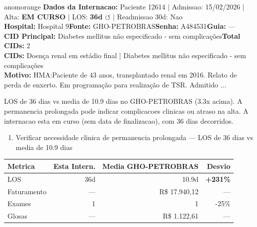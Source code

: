 \documentclass[a4paper,10pt]{article}
\begin{document}
\begin{anomalycard}[Internacao 165811 | GHO-PETROBRAS | ALTO (z=3.01)]{anomorange}
\textbf{Dados da Internacao:} Paciente 12614 $\mid$ Admissao: 15/02/2026 $\mid$ Alta: \textcolor{anomorange}{\textbf{EM CURSO}} $\mid$ LOS: \textbf{36d \textcolor{anomorange}{$\circlearrowleft$}} $\mid$ Readmissao 30d: Nao\\
\textbf{Hospital:} Hospital 9\quad\textbf{Fonte:} GHO-PETROBRAS\quad\textbf{Senha:} A484531\quad\textbf{Guia:} ---\\
\textbf{CID Principal:} {\small Diabetes mellitus não especificado - sem complicações}\quad\textbf{Total CIDs:} 2\\

\textbf{CIDs:} {\scriptsize Doença renal em estádio final | Diabetes mellitus não especificado - sem complicações}\\

\textbf{Motivo:} {\scriptsize HMA:Paciente de 43 anos, transplantado renal em 2016. Relato de perda de enxerto. Em programação para realização de TSR. Admitido ...}\\

\vspace{2pt}\begin{tcolorbox}[colback=severityred!20,colframe=anomorange,title={\textbf{Interpretacao de Negocio}},fonttitle=\bfseries\small,left=4pt,right=4pt,top=3pt,bottom=3pt]
{\small LOS de 36 dias vs media de 10.9 dias no GHO-PETROBRAS (3.3x acima). A permanencia prolongada pode indicar complicacoes clinicas ou atraso na alta. A internacao esta em curso (sem data de finalizacao), com 36 dias decorridos.}
\end{tcolorbox}
\begin{tcolorbox}[colback=severityyellow!30,colframe=anomorange,title={\textbf{Recomendacoes Especificas}},fonttitle=\bfseries\small,left=4pt,right=4pt,top=3pt,bottom=3pt]
\begin{enumerate}[nosep,leftmargin=16pt]
\item {\small Verificar necessidade clinica de permanencia prolongada --- LOS de 36 dias vs media de 10.9 dias}
\end{enumerate}
\end{tcolorbox}
\begin{center}\begin{tabular}{l r r r}\toprule\textbf{Metrica} & \textbf{Esta Intern.} & \textbf{Media GHO-PETROBRAS} & \textbf{Desvio} \\\midrule
LOS & 36d & 10.9d & \textcolor{anomred}{\textbf{+231\%}} \\
Faturamento & --- & R\$ 17.940,12 & --- \\
Exames & 1 & 1 & -25\% \\
Glosas & --- & R\$ 1.122,61 & --- \\
\bottomrule\end{tabular}\end{center}


\end{anomalycard}
\end{document}
